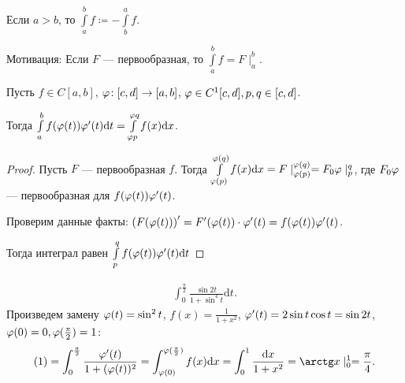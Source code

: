 \begin{remark}[Соглашение]
    Если $a>b$, то  $\int\limits_a^b f \coloneqq -\int\limits_b^a f$.

    Мотивация: Если  $F$ --- первообразная, то  $\int\limits_a^b f = F \mid_a^b$.
\end{remark}
\begin{theorem}
    Пусть $f \in C[a, b]$, $\varphi\!: [c,d] \to [a,b]$, $\varphi \in C^1[c,d], p, q \in [c, d]$.

    Тогда  $\int\limits_a^b f(\varphi(t)) \varphi'(t) \mathrm{d}t = \int\limits_{\varphi{p}}^{\varphi{q}} f(x) \mathrm{d}x$.
\end{theorem}
\begin{proof}
    Пусть $F$ --- первообразная  $f$. Тогда  $\int\limits_{\varphi(p)}^{\varphi(q)}f(x) \mathrm{d}x = F \mid_{\varphi(p)}^{\varphi(q)} = F_0\varphi\mid_p^q$, где $F_0\varphi$ --- первообразная для  $f(\varphi(t))\varphi'(t)$.

    Проверим данные факты:  $\left(F(\varphi(t))\right)' = F'(\varphi(t)) \cdot \varphi'(t) = f(\varphi(t))\varphi'(t)$.

    Тогда интеграл равен $\int\limits_{p}^qf(\varphi(t))\varphi'(t) \mathrm{d}t$
\end{proof}
\begin{example}
\begin{align}
    \int_0^{\frac{\pi}{2}} \frac{\sin 2t}{1 + \sin^4 t} \mathrm{d}t 
.\end{align}
Произведем замену $\varphi(t) = \sin^2 t$,  $f(x) = \frac{1}{1+x^2}$, $\varphi'(t) = 2 \sin t \cos t = \sin 2t$, $\varphi(0) = 0, \varphi(\frac{\pi}{2}) = 1$:
\begin{align*}
    (1) = \int_{0}^{\frac{\pi}{2}} \frac{\vphi'(t)}{1 + (\vphi(t))^2} = \int_{\vphi(0)}^{\vphi(\frac{\pi}{2})} f(x)\mathrm{d}x = \int_0^1 \frac{\mathrm{d}x}{1+x^2} = \arctg x \mid_0^1 = \frac{\pi}{4}.
\end{align*}
\end{example}
